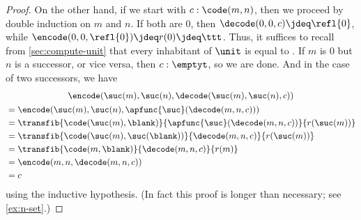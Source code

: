 \begin{proof}
  On the other hand, if we start with $c:\code(m,n)$, then we proceed by double induction on $m$ and $n$.
  If both are $0$, then $\decode(0,0,c) \jdeq \refl{0}$, while $\encode(0,0,\refl{0})\jdeq r(0) \jdeq \ttt$.
  Thus, it suffices to recall from \cref{sec:compute-unit} that every inhabitant of $\unit$ is equal to \ttt.
  If $m$ is $0$ but $n$ is a successor, or vice versa, then $c:\emptyt$, so we are done.
  And in the case of two successors, we have
  \begin{multline*}
    \encode(\suc(m),\suc(n),\decode(\suc(m),\suc(n),c))\\
    \begin{aligned}
    &= \encode(\suc(m),\suc(n),\apfunc{\suc}(\decode(m,n,c)))\\
    &= \transfib{\code(\suc(m),{\blank})}{\apfunc{\suc}(\decode(m,n,c))}{r(\suc(m))}\\
    &= \transfib{\code(\suc(m),\suc({\blank}))}{\decode(m,n,c)}{r(\suc(m))}\\
    &= \transfib{\code(m,{\blank})}{\decode(m,n,c)}{r(m)}\\
    &= \encode(m,n,\decode(m,n,c))\\
    &= c
  \end{aligned}
  \end{multline*}
  using the inductive hypothesis.
  (In fact this proof is longer than necessary; see \cref{ex:n-set}.)
\end{proof}
